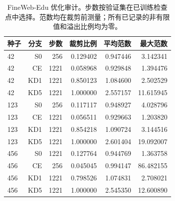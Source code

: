 \begin{table}[!t]\centering
\begin{tabular}{lrrrrr}
\toprule
种子 & 分支 & 步数 & 裁剪比例 & 平均范数 & 最大范数 \\
\midrule
42 & S0 & 256 & 0.129402 & 0.947446 & 3.142341 \\
42 & CE & 1221 & 0.058968 & 0.929848 & 1.394476 \\
42 & KD1 & 1221 & 0.850123 & 1.084600 & 2.502529 \\
42 & KD5 & 1221 & 1.000000 & 2.557157 & 11.615945 \\
123 & S0 & 256 & 0.117117 & 0.948927 & 4.028796 \\
123 & CE & 1221 & 0.056511 & 0.929663 & 1.203820 \\
123 & KD1 & 1221 & 0.854218 & 1.090724 & 3.144516 \\
123 & KD5 & 1221 & 1.000000 & 2.601404 & 19.092007 \\
456 & S0 & 1221 & 0.127764 & 0.944769 & 1.363758 \\
456 & CE & 256 & 0.045045 & 0.994147 & 86.482155 \\
456 & KD1 & 1221 & 0.798526 & 1.074831 & 2.708021 \\
456 & KD5 & 1221 & 1.000000 & 2.545350 & 12.600890 \\
\bottomrule
\end{tabular}
\caption{FineWeb-Edu 优化审计。步数按验证集在已训练检查点中选择。范数均在裁剪前测量；所有已记录的非有限值和溢出比例均为零。}\label{tab:modern_optimization}
\end{table}
